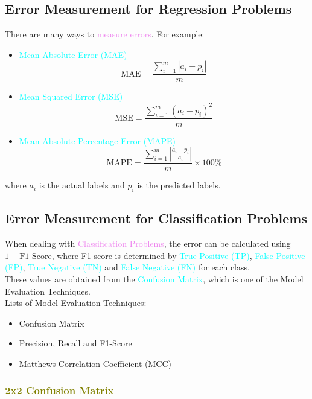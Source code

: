 \documentclass{book}
\begin{document}
\subsection{Error Measurement for Regression Problems}
There are many ways to \textcolor{violet}{measure errors}. For example:
\begin{itemize}
    \item \textcolor{cyan}{Mean Absolute Error (MAE)}
    \[
        \text{MAE} = \frac{\sum_{i=1}^{m} |a_i - p_i|}{m}
    \]
    \item \textcolor{cyan}{Mean Squared Error (MSE)}
    \[
        \text{MSE} = \frac{\sum_{i=1}^{m} (a_i - p_i)^2}{m}
    \]
    \item \textcolor{cyan}{Mean Absolute Percentage Error (MAPE)}
    \[
        \text{MAPE} = \frac{\sum_{i=1}^{m} \left|\frac{a_i - p_i}{a_i}\right|}{m} \times 100\%
    \]
\end{itemize}
where \(a_i\) is the actual labels and \(p_i\) is the predicted labels.
\subsection{Error Measurement for Classification Problems}
When dealing with \textcolor{violet}{Classification Problems}, the error can be calculated using \(1 - \text{F1-Score}\), where F1-score is determined by \textcolor{cyan}{True Positive (TP)}, \textcolor{cyan}{False Positive (FP)}, \textcolor{cyan}{True Negative (TN)} and \textcolor{cyan}{False Negative (FN)} for each class. \\
These values are obtained from the \textcolor{cyan}{Confusion Matrix}, which is one of the Model Evaluation Techniques.\\
\vspace{1mm}
Lists of Model Evaluation Techniques:
\begin{itemize}
    \item Confusion Matrix
    \item Precision, Recall and F1-Score
    \item Matthews Correlation Coefficient (MCC)
\end{itemize}
\textcolor{olive}{\subsubsection{2x2 Confusion Matrix}}
\end{document}
